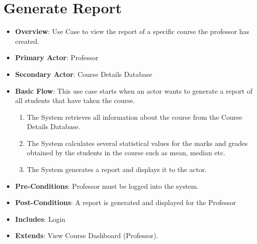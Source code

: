 \documentclass[12pt, a4]{report}
\begin{document}
\section{Generate Report}
\begin{itemize}
    \item \textbf{Overview}: Use Case to view the report of a specific course the professor has created.
    \item \textbf{Primary Actor}: Professor
    \item \textbf{Secondary Actor}: Course Details Database
    \item \textbf{Basic Flow}: This use case starts when an actor wants to generate a report of all students that have taken the course.
        \begin{enumerate}
            \item The System retrieves all information about the course from the Course Details Database.
            \item The System calculates several statistical values for the marks and grades obtained by the students in the course such as mean, median etc.
            \item The System generates a report and displays it to the actor.
        \end{enumerate}
    \item \textbf{Pre-Conditions}: Professor must be logged into the system.
    \item \textbf{Post-Conditions}: A report is generated and displayed for the Professor
    \item \textbf{Includes}: Login
    \item \textbf{Extends}: View Course Dashboard (Professor).
\end{itemize}

\end{document}
